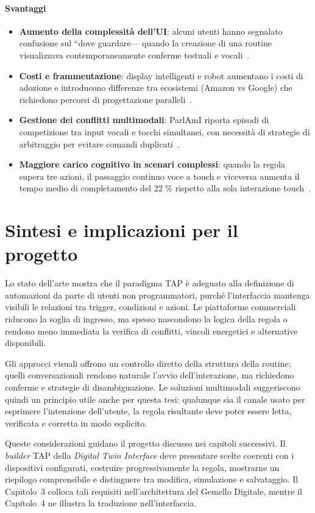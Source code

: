 \paragraph{Svantaggi}
\begin{itemize}
  \item \textbf{Aumento della complessità dell’UI}: alcuni utenti hanno segnalato   confusione sul “dove guardare— quando la creazione di una routine visualizzava contemporaneamente conferme testuali e vocali~\cite{Barricelli2024}.
  \item \textbf{Costi e frammentazione}: display intelligenti e robot aumentano i costi
        di adozione e introducono differenze tra ecosistemi (Amazon vs Google)
        che richiedono percorsi di progettazione paralleli~\cite{Barricelli2024}.
  \item \textbf{Gestione dei conflitti multimodali}: ParlAmI riporta episodi
        di competizione tra input vocali e tocchi simultanei, con necessità di
        strategie di arbitraggio per evitare comandi duplicati~\cite{ParlAmi2019}.
  \item \textbf{Maggiore carico cognitivo in scenari complessi}: quando la
        regola supera tre azioni, il passaggio continuo voce a touch e viceversa aumenta il tempo
        medio di completamento del 22 \% rispetto alla sola interazione touch~\cite{Barricelli2024}.
\end{itemize}

\section{Sintesi e implicazioni per il progetto}
Lo stato dell'arte mostra che il paradigma TAP \`e adeguato alla definizione di automazioni da parte di utenti non programmatori, purch\'e l'interfaccia mantenga visibili le relazioni tra trigger, condizioni e azioni. Le piattaforme commerciali riducono la soglia di ingresso, ma spesso nascondono la logica della regola o rendono meno immediata la verifica di conflitti, vincoli energetici e alternative disponibili.

Gli approcci visuali offrono un controllo diretto della struttura della routine; quelli conversazionali rendono naturale l'avvio dell'interazione, ma richiedono conferme e strategie di disambiguazione. Le soluzioni multimodali suggeriscono quindi un principio utile anche per questa tesi: qualunque sia il canale usato per esprimere l'intenzione dell'utente, la regola risultante deve poter essere letta, verificata e corretta in modo esplicito.

Queste considerazioni guidano il progetto discusso nei capitoli successivi. Il \textit{builder} TAP della \textit{Digital Twin Interface} deve presentare scelte coerenti con i dispositivi configurati, costruire progressivamente la regola, mostrarne un riepilogo comprensibile e distinguere tra modifica, simulazione e salvataggio. Il Capitolo~3 colloca tali requisiti nell'architettura del Gemello Digitale, mentre il Capitolo~4 ne illustra la traduzione nell'interfaccia.
